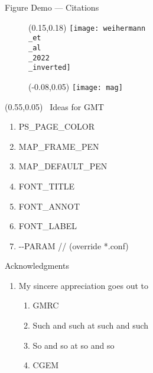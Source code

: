 \documentclass[light]{cgem-presentation}
\begin{document}
  \begin{frame}{Figure Demo --- Citations}
    \begin{figure}
      \begin{textblock*}{0.7\paperwidth}(0.15\paperwidth,0.18\paperheight)
        \texttt{[image: weihermann\\\_et\\\_al\\\_2022\\\_inverted]}
      \end{textblock*}
    \end{figure}
  \end{frame}

  \begin{frame}
    \begin{figure}
      \begin{textblock*}{0.7\paperwidth}(-0.08\paperwidth,0.05\paperheight)
        \texttt{[image: mag]}
      \end{textblock*}
    \end{figure}
    \begin{textblock*}{0.5\paperwidth}(0.55\paperwidth,0.05\paperheight)
      \Huge
      \,\,\,Ideas for GMT
      \begin{enumerate}
        \item PS\_PAGE\_COLOR
        \item MAP\_FRAME\_PEN
        \item MAP\_DEFAULT\_PEN
        \item FONT\_TITLE
        \item FONT\_ANNOT
        \item FONT\_LABEL
        \item -\hspace{0.1mm}-PARAM //
          (override *.conf)
      \end{enumerate}
    \end{textblock*}

  \end{frame}

  \begin{frame}{Acknowledgments}
    \vspace{-2cm}
    \begin{enumerate}
      \item My sincere appreciation goes out to
      \begin{enumerate}
        \item GMRC
        \item Such and such at such and such
        \item So and so at so and so
        \item CGEM 
      \end{enumerate}
    \end{enumerate}
  \end{frame}
\end{document}
